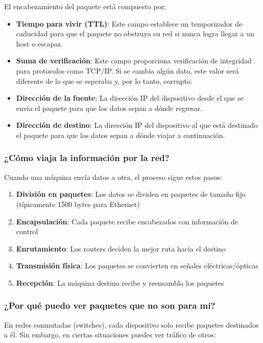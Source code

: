 \begin{itemize}
El encabezamiento del paquete está compuesto por:
\begin{itemize}
    \item \textbf{Tiempo para vivir (TTL)}: Este campo establece un temporizador de caducidad para que el paquete no obstruya su red si nunca logra llegar a un host o escapar.
    \item \textbf{Suma de verificación}: Este campo proporciona verificación de integridad para protocolos como TCP/IP. Si se cambia algún dato, este valor será diferente de lo que se esperaba y, por lo tanto, corrupto.
    \item \textbf{Dirección de la fuente}: La dirección IP del dispositivo desde el que se envía el paquete para que los datos sepan a dónde regresar.
    \item \textbf{Dirección de destino}: La dirección IP del dispositivo al que está destinado el paquete para que los datos sepan a dónde viajar a continuación.
\end{itemize}

\subsubsection{¿Cómo viaja la información por la red?}

Cuando una máquina envía datos a otra, el proceso sigue estos pasos:

\begin{enumerate}
    \item \textbf{División en paquetes}: Los datos se dividen en paquetes de tamaño fijo (típicamente 1500 bytes para Ethernet)
    \item \textbf{Encapsulación}: Cada paquete recibe encabezados con información de control
    \item \textbf{Enrutamiento}: Los routers deciden la mejor ruta hacia el destino
    \item \textbf{Transmisión física}: Los paquetes se convierten en señales eléctricas/ópticas
    \item \textbf{Recepción}: La máquina destino recibe y reensambla los paquetes
\end{enumerate}

\subsubsection{¿Por qué puedo ver paquetes que no son para mí?}

En redes conmutadas (switches), cada dispositivo solo recibe paquetes destinados a él. Sin embargo, en ciertas situaciones puedes ver tráfico de otros:


\end{itemize}
